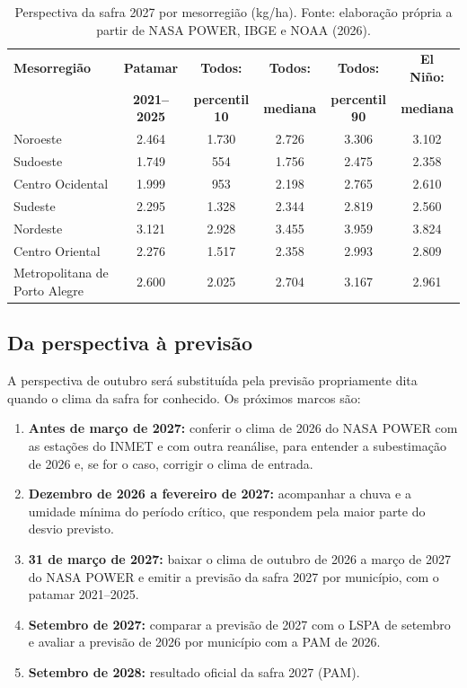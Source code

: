 \documentclass[12pt]{article}
\begin{document}
\begin{table}[ht]
\centering
\caption{Perspectiva da safra 2027 por mesorregião (kg/ha). Fonte:
  elaboração própria a partir de NASA POWER, IBGE e NOAA (2026).}
\label{tab:meso2027}
\small
\begin{tabular}{|p{2.8cm}|c|c|c|c|c|}
\hline
\textbf{Mesorregião} & \textbf{Patamar} & \textbf{Todos:} &
  \textbf{Todos:} & \textbf{Todos:} & \textbf{El Niño:} \\
 & \textbf{2021--2025} & \textbf{percentil 10} & \textbf{mediana} &
  \textbf{percentil 90} & \textbf{mediana} \\ \hline
Noroeste & 2.464 & 1.730 & 2.726 & 3.306 & 3.102 \\ \hline
Sudoeste & 1.749 & 554 & 1.756 & 2.475 & 2.358 \\ \hline
Centro Ocidental & 1.999 & 953 & 2.198 & 2.765 & 2.610 \\ \hline
Sudeste & 2.295 & 1.328 & 2.344 & 2.819 & 2.560 \\ \hline
Nordeste & 3.121 & 2.928 & 3.455 & 3.959 & 3.824 \\ \hline
Centro Oriental & 2.276 & 1.517 & 2.358 & 2.993 & 2.809 \\ \hline
Metropolitana de Porto Alegre & 2.600 & 2.025 & 2.704 & 3.167 & 2.961 \\ \hline
\end{tabular}
\end{table}

\subsection{Da perspectiva à previsão}

A perspectiva de outubro será substituída pela previsão propriamente dita
quando o clima da safra for conhecido. Os próximos marcos são:

\begin{enumerate}
  \item \textbf{Antes de março de 2027:} conferir o clima de 2026 do NASA
    POWER com as estações do INMET e com outra reanálise, para entender a
    subestimação de 2026 e, se for o caso, corrigir o clima de entrada.
  \item \textbf{Dezembro de 2026 a fevereiro de 2027:} acompanhar a chuva
    e a umidade mínima do período crítico, que respondem pela maior parte
    do desvio previsto.
  \item \textbf{31 de março de 2027:} baixar o clima de outubro de 2026 a
    março de 2027 do NASA POWER e emitir a previsão da safra 2027 por
    município, com o patamar 2021--2025.
  \item \textbf{Setembro de 2027:} comparar a previsão de 2027 com o LSPA
    de setembro e avaliar a previsão de 2026 por município com a PAM de
    2026.
  \item \textbf{Setembro de 2028:} resultado oficial da safra 2027 (PAM).
\end{enumerate}
\end{document}
